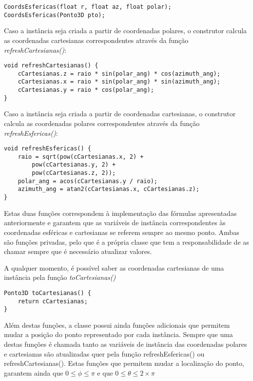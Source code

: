 \begin{Verbatim}
CoordsEsfericas(float r, float az, float polar);
CoordsEsfericas(Ponto3D pto);
\end{Verbatim}

Caso a instância seja criada a partir de coordenadas polares, o construtor calcula as coordenadas cartesianas correspondentes através da função \textit{refreshCartesianas()}:

\begin{Verbatim}
void refreshCartesianas() {
	cCartesianas.z = raio * sin(polar_ang) * cos(azimuth_ang);
	cCartesianas.x = raio * sin(polar_ang) * sin(azimuth_ang);
	cCartesianas.y = raio * cos(polar_ang);
}
\end{Verbatim}

Caso a instância seja criada a partir de coordenadas cartesianas, o construtor calcula as coordenadas polares correspondentes através da função \textit{refreshEsfericas()}:

\begin{Verbatim}
void refreshEsfericas() {
	raio = sqrt(pow(cCartesianas.x, 2) + 
		pow(cCartesianas.y, 2) + 
		pow(cCartesianas.z, 2));
	polar_ang = acos(cCartesianas.y / raio);
	azimuth_ang = atan2(cCartesianas.x, cCartesianas.z);
}
\end{Verbatim}

Estas duas funções correspondem à implementação das fórmulas apresentadas anteriormente e garantem que as variáveis de instância correspondentes às coordenadas esféricas e cartesianas se referem sempre ao mesmo ponto. Ambas são funções privadas, pelo que é a própria classe que tem a responsabilidade de as chamar sempre que é necessário atualizar valores.

A qualquer momento, é possível saber as coordenadas cartesianas de uma instância pela função \textit{toCartesianas()}

\begin{Verbatim}
Ponto3D toCartesianas() {
	return cCartesianas;
}
\end{Verbatim}

Além destas funções, a classe possui ainda funções adicionais que permitem mudar a posição do ponto representado por cada instância. Sempre que uma destas funções é chamada tanto as variáveis de instância das coordenadas polares e cartesianas são atualizadas quer pela função refreshEsfericas() ou refreshCartesianas(). Estas funções que permitem mudar a localização do ponto, garantem ainda que $0 \leq \phi \leq \pi$ e que $0 \leq \theta \leq 2 \times \pi$

